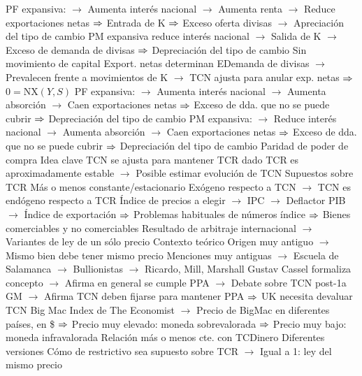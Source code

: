 \documentclass{nuevotema}
\begin{document}
\begin{esquemal}
				\4[] PF expansiva:
				\4[] $\to$ Aumenta interés nacional
				\4[] $\to$ Aumenta renta
				\4[] $\to$ Reduce exportaciones netas
				\4[] $\Rightarrow$ Entrada de K $\Rightarrow$ Exceso oferta divisas
				\4[] $\to$ Apreciación del tipo de cambio
				\4[] PM expansiva reduce interés nacional
				\4[] $\to$ Salida de K
				\4[] $\to$ Exceso de demanda de divisas
				\4[] $\Rightarrow$ Depreciación del tipo de cambio
				\4 Sin movimiento de capital
				\4[] Export. netas determinan EDemanda de divisas
				\4[] $\to$ Prevalecen frente a movimientos de K
				\4[] $\to$ TCN ajusta para anular exp. netas
				\4[] $\Rightarrow$ $0=\text{NX}(Y,S)$
				\4[] PF expansiva:
				\4[] $\to$ Aumenta interés nacional
				\4[] $\to$ Aumenta absorción
				\4[] $\to$ Caen exportaciones netas
				\4[] $\Rightarrow$ Exceso de dda. que no se puede cubrir
				\4[] $\Rightarrow$ Depreciación del tipo de cambio
				\4[] PM expansiva:
				\4[] $\to$ Reduce interés nacional
				\4[] $\to$ Aumenta absorción
				\4[] $\to$ Caen exportaciones netas
				\4[] $\Rightarrow$ Exceso de dda. que no se puede cubrir
				\4[] $\Rightarrow$ Depreciación del tipo de cambio
		\2 Paridad de poder de compra
			\3 Idea clave
				\4 TCN se ajusta para mantener TCR dado
				\4[] TCR es aproximadamente estable
				\4[] $\to$ Posible estimar evolución de TCN
				\4 Supuestos sobre TCR
				\4[] Más o menos constante/estacionario
				\4[] Exógeno respecto a TCN
				\4[] $\to$ TCN es endógeno respecto a TCR
				\4[] Índice de precios a elegir
				\4[] $\to$ IPC
				\4[] $\to$ Deflactor PIB
				\4[] $\to$ Índice de exportación
				\4[] $\Rightarrow$ Problemas habituales de números índice
				\4[] $\Rightarrow$ Bienes comerciables y no comerciables
				\4[] Resultado de arbitraje internacional
				\4[] $\to$ Variantes de ley de un sólo precio
				\4 Contexto teórico
				\4[] Origen muy antiguo
				\4[] $\to$ Mismo bien debe tener mismo precio
				\4[] Menciones muy antiguas
				\4[] $\to$ Escuela de Salamanca
				\4[] $\to$ Bullionistas
				\4[]  $\to$ Ricardo, Mill, Marshall
				\4[] Gustav Cassel formaliza concepto
				\4[] $\to$ Afirma en general se cumple PPA
				\4[] $\to$ Debate sobre TCN post-1a GM
				\4[] $\to$ Afirma TCN deben fijarse para mantener PPA
				\4[] $\Rightarrow$ UK necesita devaluar TCN
				\4[] Big Mac Index de The Economist
				\4[] $\to$ Precio de BigMac en diferentes países, en \$
				\4[] $\Rightarrow$ Precio muy elevado: moneda sobrevalorada
				\4[] $\Rightarrow$ Precio muy bajo: moneda infravalorada
				\4[] Relación más o menos cte. con TCDinero
				\4 Diferentes versiones
				\4[] Cómo de restrictivo sea supuesto sobre TCR
				\4[] $\to$ Igual a 1: ley del mismo precio

\end{esquemal}
\end{document}
